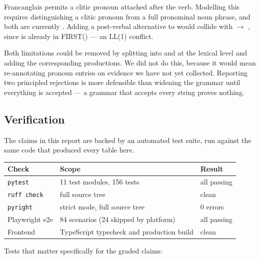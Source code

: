Francanglais permits a clitic pronoun attached after the verb. Modelling this requires
distinguishing a clitic pronoun from a full pronominal noun phrase, and both are currently
. Adding a post-verbal  alternative to  would collide
with  $\rightarrow$  , since  is
already in FIRST() --- an LL(1) conflict.

\begin{limitbox}
Both limitations could be removed by splitting  into  and
 at the lexical level and adding the corresponding productions. We did not do
this, because it would mean re-annotating pronoun entries on evidence we have not yet
collected. Reporting two principled rejections is more defensible than widening the grammar
until everything is accepted --- a grammar that accepts every string proves nothing.
\end{limitbox}

\subsection{Verification}

The claims in this report are backed by an automated test suite, run against the same code
that produced every table here.

\begin{center}
\begin{tabular}{@{}lll@{}}
\toprule
\textbf{Check} & \textbf{Scope} & \textbf{Result} \\
\midrule
\texttt{pytest} & 11 test modules, 156 tests & all passing \\
\texttt{ruff check} & full source tree & clean \\
\texttt{pyright} & strict mode, full source tree & 0 errors \\
Playwright e2e & 84 scenarios (24 skipped by platform) & all passing \\
Frontend & TypeScript typecheck and production build & clean \\
\bottomrule
\end{tabular}
\end{center}

Tests that matter specifically for the graded claims:

